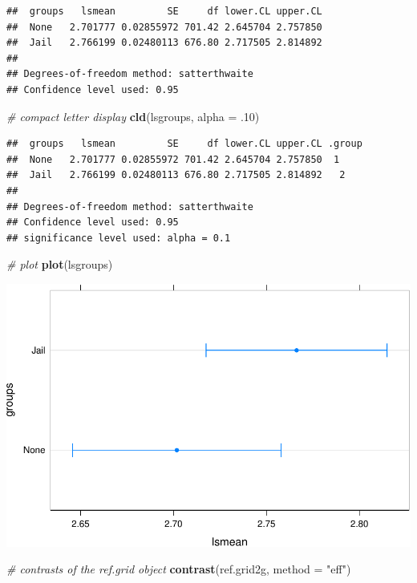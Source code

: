 \documentclass[]{article}
\newenvironment{Shaded}{\begin{snugshade}}{\end{snugshade}}
\newcommand{\KeywordTok}[1]{\textcolor[rgb]{0.13,0.29,0.53}{\textbf{#1}}}
\newcommand{\DataTypeTok}[1]{\textcolor[rgb]{0.13,0.29,0.53}{#1}}
\newcommand{\DecValTok}[1]{\textcolor[rgb]{0.00,0.00,0.81}{#1}}
\newcommand{\StringTok}[1]{\textcolor[rgb]{0.31,0.60,0.02}{#1}}
\newcommand{\CommentTok}[1]{\textcolor[rgb]{0.56,0.35,0.01}{\textit{#1}}}
\newcommand{\NormalTok}[1]{#1}
\begin{document}
\begin{verbatim}
##  groups   lsmean         SE     df lower.CL upper.CL
##  None   2.701777 0.02855972 701.42 2.645704 2.757850
##  Jail   2.766199 0.02480113 676.80 2.717505 2.814892
## 
## Degrees-of-freedom method: satterthwaite 
## Confidence level used: 0.95
\end{verbatim}

\begin{Shaded}
\begin{Highlighting}[]
\CommentTok{# compact letter display}
\KeywordTok{cld}\NormalTok{(lsgroups, }\DataTypeTok{alpha =}\NormalTok{ .}\DecValTok{10}\NormalTok{)}
\end{Highlighting}
\end{Shaded}

\begin{verbatim}
##  groups   lsmean         SE     df lower.CL upper.CL .group
##  None   2.701777 0.02855972 701.42 2.645704 2.757850  1    
##  Jail   2.766199 0.02480113 676.80 2.717505 2.814892   2   
## 
## Degrees-of-freedom method: satterthwaite 
## Confidence level used: 0.95 
## significance level used: alpha = 0.1
\end{verbatim}

\begin{Shaded}
\begin{Highlighting}[]
\CommentTok{# plot}
\KeywordTok{plot}\NormalTok{(lsgroups)}
\end{Highlighting}
\end{Shaded}

\includegraphics{Conditional_Models_doc_files/figure-latex/unnamed-chunk-37-1.pdf}

\begin{Shaded}
\begin{Highlighting}[]
\CommentTok{# contrasts of the ref.grid object}
\KeywordTok{contrast}\NormalTok{(ref.grid2g, }\DataTypeTok{method =} \StringTok{"eff"}\NormalTok{)}
\end{Highlighting}
\end{Shaded}
\end{document}
